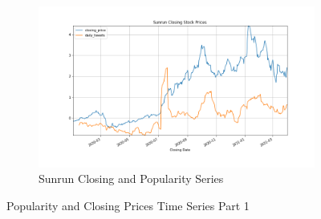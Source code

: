 \documentclass[sigconf, nonacm]{acmart}
\begin{document}
\begin{figure}[H]
\begin{subfigure}[b]{0.5\textwidth}
   \includegraphics[width=\textwidth]{popularity_time_series/Sunrun Closing Stock Prices_closing_price_daily_tweets.png} 
   \caption{Sunrun Closing and Popularity Series}
   \label{fig:Ng1} 
\end{subfigure}
\caption{Popularity and Closing Prices Time Series Part 1}
\end{figure}
\end{document}
